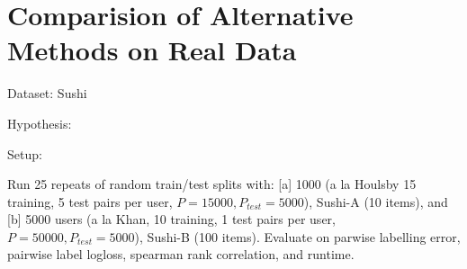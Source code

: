 \section{Comparision of Alternative Methods on Real Data}\label{sec:exp_small}

Dataset: Sushi

Hypothesis: 


Setup:

Run 25 repeats of random train/test splits with:
% 
[a] 1000 (a la Houlsby 15 training, 5 test pairs per user, $P=15000,P_{test}=5000$), Sushi-A (10 items), 
and [b] 5000 users (a la Khan, 10 training, 1 test pairs per user, $P=50000, P_{test}=5000$), Sushi-B (100 items).
Evaluate on parwise labelling error, pairwise label logloss, spearman rank correlation,
and runtime.


